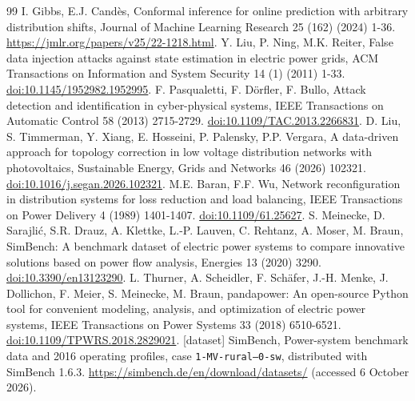 \documentclass[11pt,a4paper]{article}
\begin{document}
\begin{thebibliography}{99}
 I. Gibbs, E.J. Cand\`es, Conformal inference for online prediction with arbitrary distribution shifts, Journal of Machine Learning Research 25 (162) (2024) 1-36. \url{https://jmlr.org/papers/v25/22-1218.html}.
 Y. Liu, P. Ning, M.K. Reiter, False data injection attacks against state estimation in electric power grids, ACM Transactions on Information and System Security 14 (1) (2011) 1-33. \href{https://doi.org/10.1145/1952982.1952995}{doi:10.1145/1952982.1952995}.
 F. Pasqualetti, F. D\"orfler, F. Bullo, Attack detection and identification in cyber-physical systems, IEEE Transactions on Automatic Control 58 (2013) 2715-2729. \href{https://doi.org/10.1109/TAC.2013.2266831}{doi:10.1109/TAC.2013.2266831}.
 D. Liu, S. Timmerman, Y. Xiang, E. Hosseini, P. Palensky, P.P. Vergara, A data-driven approach for topology correction in low voltage distribution networks with photovoltaics, Sustainable Energy, Grids and Networks 46 (2026) 102321. \href{https://doi.org/10.1016/j.segan.2026.102321}{doi:10.1016/j.segan.2026.102321}.
 M.E. Baran, F.F. Wu, Network reconfiguration in distribution systems for loss reduction and load balancing, IEEE Transactions on Power Delivery 4 (1989) 1401-1407. \href{https://doi.org/10.1109/61.25627}{doi:10.1109/61.25627}.
 S. Meinecke, D. Sarajli\'c, S.R. Drauz, A. Klettke, L.-P. Lauven, C. Rehtanz, A. Moser, M. Braun, SimBench: A benchmark dataset of electric power systems to compare innovative solutions based on power flow analysis, Energies 13 (2020) 3290. \href{https://doi.org/10.3390/en13123290}{doi:10.3390/en13123290}.
 L. Thurner, A. Scheidler, F. Sch\"afer, J.-H. Menke, J. Dollichon, F. Meier, S. Meinecke, M. Braun, pandapower: An open-source Python tool for convenient modeling, analysis, and optimization of electric power systems, IEEE Transactions on Power Systems 33 (2018) 6510-6521. \href{https://doi.org/10.1109/TPWRS.2018.2829021}{doi:10.1109/TPWRS.2018.2829021}.
 [dataset] SimBench, Power-system benchmark data and 2016 operating profiles, case \texttt{1-MV-rural--0-sw}, distributed with SimBench 1.6.3. \url{https://simbench.de/en/download/datasets/} (accessed 6 October 2026).
\end{thebibliography}
\end{document}

